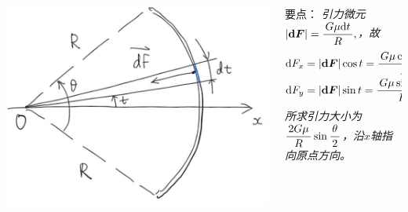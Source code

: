 \begin{frame}
	\linespread{1.5}
	\pause
	
	\bigskip
	
	\begin{columns}
		\begin{column}{.4\textwidth}
			\begin{center}
				\includegraphics[width=\textwidth]{./images/ch6/theSphGr.jpg}
			\end{center}		
		\end{column}
		\begin{column}{.6\textwidth}
			\small 要点：\it
			引力微元
			$|\bm{\mathrm{d} F}|=\displaystyle\frac{\,{G\mu\mathrm{d} t}\,}{\,{R}\,},$，故
			\begin{align*}
				\mathrm{d} F_x&=|\bm{\mathrm{d} F}|\cos t=\displaystyle\frac{\,{G\mu\cos t\mathrm{d} t}\,}{\,{R}\,},\\
				\mathrm{d} F_y&=|\bm{\mathrm{d} F}|\sin t=\displaystyle\frac{\,{G\mu\sin t\mathrm{d} t}\,}{\,{R}\,},
			\end{align*}
			所求引力大小为$\displaystyle\frac{\,{2G\mu}\,}{\,{R}\,}\sin\displaystyle\frac{\,{\theta}\,}{\,{2}\,}$，沿$x$轴指向原点方向。
		\end{column}
	\end{columns}
\end{frame}